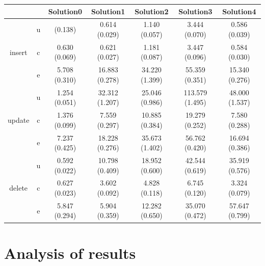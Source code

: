 \newcommand{\B}[1]{\colorbox{light-gray}{#1}}
\begin{tabular}{ccccccc}
\toprule
&&Solution0 & Solution1 & Solution2 & Solution3 & Solution4\\
\midrule
\multirow{3}{*}{insert} & u & \rc 0.624 (0.138) & 0.614 (0.029) & 1.140 (0.057)
& 3.444 (0.070) & 0.586 (0.039)\\
 & c & 0.630 (0.069) & 0.621 (0.027) & 1.181 (0.087) & 3.447 (0.096) & 0.584 (0.030)\\
 & e &  5.708 (0.310) & 16.883 (0.278) & 34.220 (1.399) & 55.359 (0.351) &
 15.340 (0.276)\\
\midrule
\multirow{3}{*}{update} & u & 1.254 (0.051) & 32.312 (1.207) & 25.046
(0.986) & 113.579 (1.495) & 48.000 (1.537)\\
 & c &  1.376 (0.099) & 7.559 (0.297) & 10.885 (0.384) & 19.279 (0.252) &
 7.580 (0.288)\\
 & e & 7.237 (0.425) & 18.228 (0.276) & 35.673 (1.402) & 56.762 (0.420) & 16.694 (0.386)\\
\midrule
\multirow{3}{*}{delete} & u & 0.592 (0.022) & 10.798 (0.409) & 18.952
(0.600) & 42.544 (0.619) & 35.919 (0.576)\\
 & c & 0.627 (0.023) & 3.602 (0.092) & 4.828 (0.118) & 6.745 (0.120) & 3.324 (0.079)\\
 & e & 5.847 (0.294) & 5.904 (0.359) & 12.282 (0.650) & 35.070 (0.472) & 57.647 (0.799)\\
\bottomrule
\end{tabular}

\section{Analysis of results}
